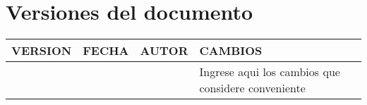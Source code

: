 \newpage
\section{Versiones del documento}

\begin{table}[H]
\begin{tabular}{|m{1.3cm}|m{1.2cm}|m{1cm}|m{6cm}|} \hline
\cellcolor{colorTerciario}\color{white}VERSION & \cellcolor{colorTerciario}\color{white}FECHA & \cellcolor{colorTerciario}\color{white}AUTOR & \cellcolor{colorTerciario}\color{white}CAMBIOS \\ \hline
 &  &   &  Ingrese aqui los cambios que considere conveniente \\ \hline
\end{tabular}
\end{table}